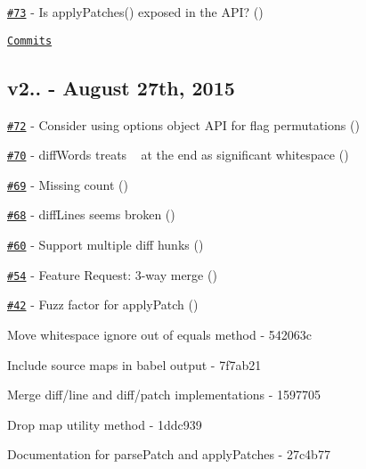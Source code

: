 \begin{DoxyItemize}
\item \href{https://github.com/kpdecker/jsdiff/issues/73}{\tt \#73} -\/ Is apply\+Patches() exposed in the A\+PI? (\href{https://api.github.com/users/davidparsson}{\tt })
\end{DoxyItemize}

\href{https://github.com/kpdecker/jsdiff/compare/v2.1.0...v2.1.1}{\tt Commits}

\subsection*{v2.. -\/ August 27th, 2015}


\begin{DoxyItemize}
\item \href{https://github.com/kpdecker/jsdiff/issues/72}{\tt \#72} -\/ Consider using options object A\+PI for flag permutations (\href{https://api.github.com/users/kpdecker}{\tt })
\item \href{https://github.com/kpdecker/jsdiff/issues/70}{\tt \#70} -\/ diff\+Words treats ~\newline
 at the end as significant whitespace (\href{https://api.github.com/users/nesQuick}{\tt })
\item \href{https://github.com/kpdecker/jsdiff/issues/69}{\tt \#69} -\/ Missing count (\href{https://api.github.com/users/wfalkwallace}{\tt })
\item \href{https://github.com/kpdecker/jsdiff/issues/68}{\tt \#68} -\/ diff\+Lines seems broken (\href{https://api.github.com/users/wfalkwallace}{\tt })
\item \href{https://github.com/kpdecker/jsdiff/issues/60}{\tt \#60} -\/ Support multiple diff hunks (\href{https://api.github.com/users/piranna}{\tt })
\item \href{https://github.com/kpdecker/jsdiff/issues/54}{\tt \#54} -\/ Feature Request\+: 3-\/way merge (\href{https://api.github.com/users/mog422}{\tt })
\item \href{https://github.com/kpdecker/jsdiff/issues/42}{\tt \#42} -\/ Fuzz factor for apply\+Patch (\href{https://api.github.com/users/stuartpb}{\tt })
\item Move whitespace ignore out of equals method -\/ 542063c
\item Include source maps in babel output -\/ 7f7ab21
\item Merge diff/line and diff/patch implementations -\/ 1597705
\item Drop map utility method -\/ 1ddc939
\item Documentation for parse\+Patch and apply\+Patches -\/ 27c4b77
\end{DoxyItemize}

